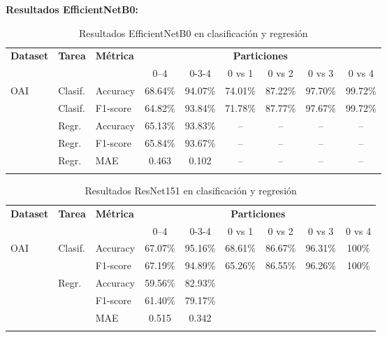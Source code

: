 \textbf{Resultados EfficientNetB0:}
\begin{table}[h]
    \centering
    \caption{Resultados EfficientNetB0 en clasificación y regresión}
    \label{tab:cnn_grande_results}
    \begin{tabular}{@{} l l l c c c c c c @{}} 
      \toprule
      \textbf{Dataset} & \textbf{Tarea} & \textbf{Métrica} 
        & \multicolumn{6}{c}{\textbf{Particiones}} \\
      \cmidrule(lr){4-9}
      & & & 0--4 & 0-3-4 & 0 vs 1 & 0 vs 2 & 0 vs 3 & 0 vs 4 \\
      \midrule
      \multirow{2}{*}{OAI}
        & Clasif. & Accuracy   & 68.64\% & 94.07\% & 74.01\% & 87.22\% & 97.70\% & 99.72\% \\
        & Clasif. & F1-score   & 64.82\% & 93.84\% & 71.78\% & 87.77\% & 97.67\% & 99.72\% \\
      \addlinespace
      \multirow{3}{*}{OAI}
        & Regr.   & Accuracy   & 65.13\% & 93.83\% & -- & -- & -- & -- \\
        & Regr.   & F1-score   & 65.84\% & 93.67\% & -- & -- & -- & -- \\
        & Regr.   & MAE        & 0.463   & 0.102   & -- & -- & -- & -- \\
      \addlinespace
    \end{tabular}
\end{table}

\begin{table}[h]
    \centering
    \caption{Resultados ResNet151 en clasificación y regresión}
    \label{tab:cnn_grande_results}
    \begin{tabular}{@{} l l l c c c c c c @{}} 
      \toprule
      \textbf{Dataset} & \textbf{Tarea} & \textbf{Métrica} 
        & \multicolumn{6}{c}{\textbf{Particiones}} \\
      \cmidrule(lr){4-9}
      & & & 0--4 & 0-3-4 & 0 vs 1 & 0 vs 2 & 0 vs 3 & 0 vs 4 \\
      \midrule
      \multirow{2}{*}{OAI}
        & Clasif. & Accuracy   & 67.07\% & 95.16\% & 68.61\% & 86.67\% & 96.31\% & 100\% \\
        &         & F1-score   & 67.19\% & 94.89\% & 65.26\% & 86.55\% & 96.26\% & 100\% \\
      \addlinespace
      \multirow{3}{*}{OAI}
        & Regr.   & Accuracy   & 59.56\% & 82.93\% &  &  &  &  \\
        &         & F1-score   & 61.40\% & 79.17\% &  &  &  &  \\
        &         & MAE        & 0.515   & 0.342 &  &  &  &  \\
      \addlinespace
    \end{tabular}
\end{table}
